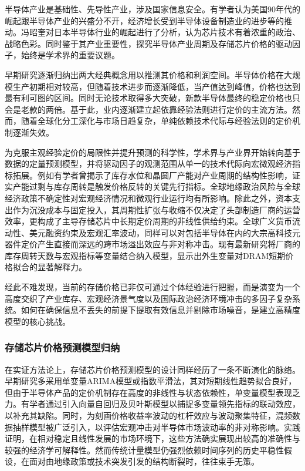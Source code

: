 \documentclass[a4paper,12pt,fontset=fandol]{ctexart}
\begin{document}
半导体产业是基础性、先导性产业，涉及国家信息安全。有学者认为美国90年代的崛起跟半导体产业的兴盛分不开，经济增长受到半导体设备制造业的进步等的推动。冯昭奎对日本半导体行业的崛起进行了分析，认为芯片技术有着浓重的政治、战略色彩\cite{feng2019}。同时鉴于其产业重要性，探究半导体产业周期及存储芯片价格的驱动因子，始终是学术界的重要议题。

早期研究逐渐归纳出两大经典概念用以推测其价格和利润空间。半导体价格在大规模生产初期相对较高，但随着技术进步而逐渐降低，当产值达到峰值，价格也达到最有利可图的区间\cite{lepselter1985}。同时无论技术取得多大突破，新款半导体最终的稳定价格也只会是老款的两倍\cite{tarui1991}。基于此，业内逐渐建立起依靠经验法则进行定价的主流方法。然而，随着全球化分工深化与市场日趋复杂，单纯依赖技术代际与经验法则的定价机制逐渐失效。

为克服主观经验定价的局限性并提升预测的科学性，学术界与产业界开始转向基于数据的定量预测模型，并将驱动因子的观测范围从单一的技术代际向宏微观经济指标拓展。例如有学者曾揭示了库存水位和晶圆厂产能对产业周期的结构性影响，证实产能过剩与库存周转是触发价格反转的关键先行指标\cite{liu2005}。全球地缘政治风险与全球经济政策不确定性对宏观经济情况和微观行业运行均有所影响\cite{pulin2020}。除此之外，资本支出作为沉没成本与固定投入，其周期性扩张与收缩不仅决定了头部制造厂商的运营效率，更构成了主导存储芯片中长期定价周期的非线性供给约束\cite{qiao2021}。全球广义货币流动性、美元融资约束及宏观汇率波动，同样可以对包括半导体在内的大宗高科技元器件定价产生直接而深远的跨市场溢出效应与非对称冲击\cite{park2025}。现有最新研究将厂商的库存周转天数与宏观指标等变量结合纳入模型，显示出外生变量对DRAM短期价格拟合的显著解释力\cite{hsu2025}。

经此不难发现，当前的存储价格已非仅可通过个体经验进行把握，而是演变为一个高度交织了产业库存、宏观经济景气度以及国际政治经济环境冲击的多因子复杂系统。如何在确保信息不丢失的前提下提取有效信息并剔除市场噪音，是建立高精度模型的核心挑战。

\subsubsection{存储芯片价格预测模型归纳}
在实证方法论上，存储芯片价格预测模型的设计同样经历了一条不断演化的脉络。早期研究多采用单变量ARIMA模型或指数平滑法，其对短期线性趋势拟合良好，但由于半导体产品的定价机制存在高度的非线性与状态依赖性，单变量模型表现乏力\cite{liu2005}。有学者通过引入向量自回归及贝叶斯模型以捕捉多变量领先指标的联动效应，以补充其缺陷\cite{liu2018}。同时，为刻画价格收益率波动的杠杆效应与波动聚集特征，混频数据抽样模型被广泛引入，以评估宏观冲击对半导体市场波动率的非对称影响\cite{snarska2025}。实践证明，在相对稳定且线性发展的市场环境下，这些方法确实展现出较高的准确性与较强的经济学可解释性。然而传统计量模型仍强烈依赖时间序列的历史平稳性假设，在面对由地缘政策或技术突发引发的结构断裂时，往往束手无策。
\end{document}
